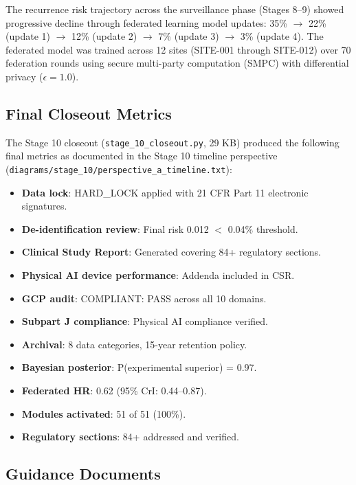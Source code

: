 \documentclass{article}
\begin{document}
The recurrence risk trajectory across the surveillance phase (Stages 8--9) showed progressive decline through federated learning model updates: 35\% $\rightarrow$ 22\% (update 1) $\rightarrow$ 12\% (update 2) $\rightarrow$ 7\% (update 3) $\rightarrow$ 3\% (update 4). The federated model was trained across 12 sites (SITE-001 through SITE-012) over 70 federation rounds using secure multi-party computation (SMPC) with differential privacy ($\epsilon = 1.0$).

\newpage

\subsection{Final Closeout Metrics}

The Stage 10 closeout (\texttt{stage\_10\_closeout.py}, 29 KB) produced the following final metrics as documented in the Stage 10 timeline perspective (\texttt{diagrams/stage\_10/perspective\_a\_timeline.txt}):

\begin{itemize}[leftmargin=*]
\item \textbf{Data lock}: HARD\_LOCK applied with 21 CFR Part 11 electronic signatures.
\item \textbf{De-identification review}: Final risk 0.012 $<$ 0.04\% threshold.
\item \textbf{Clinical Study Report}: Generated covering 84+ regulatory sections.
\item \textbf{Physical AI device performance}: Addenda included in CSR.
\item \textbf{GCP audit}: COMPLIANT: PASS across all 10 domains.
\item \textbf{Subpart J compliance}: Physical AI compliance verified.
\item \textbf{Archival}: 8 data categories, 15-year retention policy.
\item \textbf{Bayesian posterior}: P(experimental superior) = 0.97.
\item \textbf{Federated HR}: 0.62 (95\% CrI: 0.44--0.87).
\item \textbf{Modules activated}: 51 of 51 (100\%).
\item \textbf{Regulatory sections}: 84+ addressed and verified.
\end{itemize}

\subsection{Guidance Documents}
\end{document}
